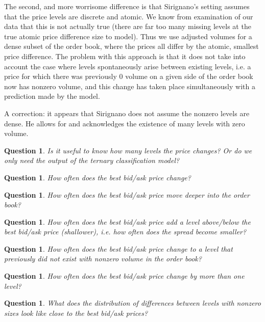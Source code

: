 \documentclass[12pt, reqno]{amsart}
\theoremstyle{definition}
\theoremstyle{definition}
\theoremstyle{plain}
\newtheorem{Ques}[theorem]{Question}
\theoremstyle{definition}
\theoremstyle{remark}
\renewcommand{\'}{\hspace{0.5mm}'}			%
\begin{document}
The second, and more worrisome difference is that Sirignano's setting assumes that the price levels are discrete and atomic. We know from examination of our data that this is not actually true (there are far too many missing levels at the true atomic price difference size to model). Thus we use adjusted volumes for a dense subset of the order book, where the prices all differ by the atomic, smallest price difference. The problem with this approach is that it does not take into account the case where levels spontaneously arise between existing levels, i.e. a price for which there was previously $0$ volume on a given side of the order book now has nonzero volume, and this change has taken place simultaneously with a prediction made by the model. 

A correction: it appears that Sirignano does not assume the nonzero levels are dense. He allows for and acknowledges the existence of many levels with zero volume. 

\begin{Ques}
	Is it useful to know how many levels the price changes? Or do we only need the output of the ternary classification model? 
\end{Ques}

\begin{Ques}
	How often does the best bid/ask price change?
\end{Ques}

\begin{Ques}
	How often does the best bid/ask price move deeper into the order book?
\end{Ques}

\begin{Ques}
	How often does the best bid/ask price add a level above/below the best bid/ask price (shallower), i.e. how often does the spread become smaller?
\end{Ques}

\begin{Ques}
	How often does the best bid/ask price change to a level that previously did not exist with nonzero volume in the order book?
\end{Ques}

\begin{Ques}
	How often does the best bid/ask price change by more than one level?
\end{Ques}

\begin{Ques}
	What does the distribution of differences between levels with nonzero sizes look like close to the best bid/ask prices?
\end{Ques}
\end{document}
